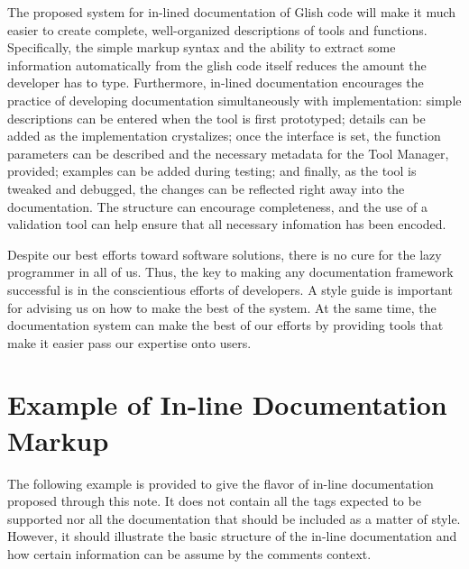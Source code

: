 The proposed system for in-lined documentation of Glish code will make
it much easier to create complete, well-organized descriptions of
tools and functions.  Specifically, the simple markup syntax and the
ability to extract some information automatically from the glish code
itself reduces the amount the developer has to type.  Furthermore,
in-lined documentation encourages the practice of developing
documentation simultaneously with implementation: simple descriptions
can be entered when the tool is first prototyped; details can be added
as the implementation crystalizes; once the interface is set, the
function parameters can be described and the necessary metadata for
the Tool Manager, provided; examples can be added during testing; and
finally, as the tool is tweaked and debugged, the changes can be
reflected right away into the documentation.  The structure can
encourage completeness, and the use of a validation tool can help
ensure that all necessary infomation has been encoded.

Despite our best efforts toward software solutions, there is no cure
for the lazy programmer in all of us.  Thus, the key to making any
documentation framework successful is in the conscientious efforts of
developers.  A style guide is important for advising us on how to make
the best of the system.  At the same time, the documentation system
can make the best of our efforts by providing tools that make it
easier pass our expertise onto users.  

\appendix
\section{Example of In-line Documentation Markup}
\label{app-sample}

The following example is provided to give the flavor of in-line
documentation proposed through this note.  It does not contain all the
tags expected to be supported nor all the documentation that should be
included as a matter of style.  However, it should illustrate the
basic structure of the in-line documentation and how certain
information can be assume by the comments context.  

